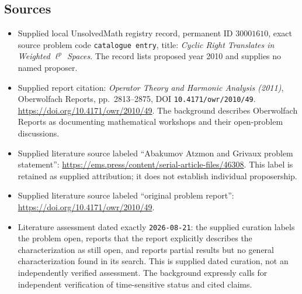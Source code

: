 \documentclass[11pt]{article}
\begin{document}
\subsection{Sources}
\begin{itemize}
\item Supplied local UnsolvedMath registry record, permanent ID \(30001610\), exact source problem code \texttt{catalogue entry}, title: \emph{Cyclic Right Translates in Weighted \(\ell^p\) Spaces}. The record lists proposed year 2010 and supplies no named proposer.
\item Supplied report citation: \emph{Operator Theory and Harmonic Analysis (2011)}, Oberwolfach Reports, pp.~2813--2875, DOI \texttt{10.4171/owr/2010/49}. \url{https://doi.org/10.4171/owr/2010/49}. The background describes Oberwolfach Reports as documenting mathematical workshops and their open-problem discussions.
\item Supplied literature source labeled ``Abakumov Atzmon and Grivaux problem statement'': \url{https://ems.press/content/serial-article-files/46308}. This label is retained as supplied attribution; it does not establish individual proposership.
\item Supplied literature source labeled ``original problem report'': \url{https://doi.org/10.4171/owr/2010/49}.
\item Literature assessment dated exactly \texttt{2026-08-21}: the supplied curation labels the problem open, reports that the report explicitly describes the characterization as still open, and reports partial results but no general characterization found in its search. This is supplied dated curation, not an independently verified assessment. The background expressly calls for independent verification of time-sensitive status and cited claims.
\end{itemize}
\end{document}
